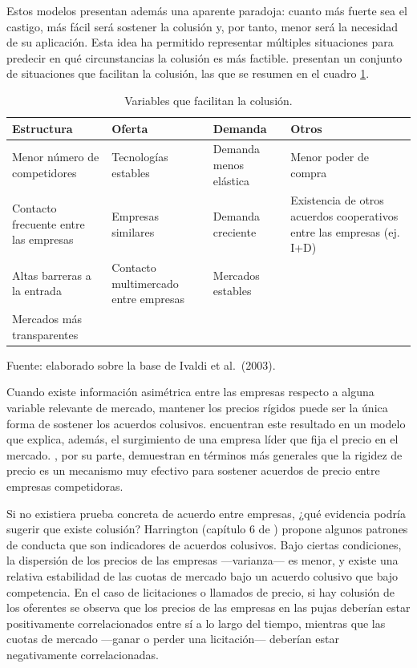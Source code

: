 \documentclass[
  12pt,
  spanish,
]{book}
\begin{document}
Estos modelos presentan además una aparente paradoja: cuanto más fuerte sea el castigo, más fácil será sostener la colusión y, por tanto, menor será la necesidad de su aplicación. Esta idea ha permitido representar múltiples situaciones para predecir en qué circunstancias la colusión es más factible. \citet{Ivaldi2003} presentan un conjunto de situaciones que facilitan la colusión, las que se resumen en el cuadro \ref{tab:cuadro4}.

\begin{table}

\caption{\label{tab:cuadro4}Variables que facilitan la colusión.}
\centering
\begin{tabular}[t]{l|l|l|l}
\hline
Estructura & Oferta & Demanda & Otros\\
\hline
Menor número de competidores & Tecnologías estables & Demanda menos elástica & Menor poder de compra\\
\hline
Contacto frecuente entre las empresas & Empresas similares & Demanda creciente & Existencia de otros acuerdos cooperativos entre las empresas (ej. I+D)\\
\hline
Altas barreras a la entrada & Contacto multimercado entre empresas & Mercados estables & \\
\hline
Mercados más transparentes &  &  & \\
\hline
\end{tabular}
\end{table}

Fuente: elaborado sobre la base de Ivaldi et al.~(2003).

Cuando existe información asimétrica entre las empresas respecto a alguna variable relevante de mercado, mantener los precios rígidos puede ser la única forma de sostener los acuerdos colusivos. \citet{Rotemberg1990} encuentran este resultado en un modelo que explica, además, el surgimiento de una empresa líder que fija el precio en el mercado. \citet{Athey2004}, por su parte, demuestran en términos más generales que la rigidez de precio es un mecanismo muy efectivo para sostener acuerdos de precio entre empresas competidoras.

Si no existiera prueba concreta de acuerdo entre empresas, ¿qué evidencia podría sugerir que existe colusión? Harrington (capítulo 6 de \citet{Buccirossi2008}) propone algunos patrones de conducta que son indicadores de acuerdos colusivos. Bajo ciertas condiciones, la dispersión de los precios de las empresas ---varianza--- es menor, y existe una relativa estabilidad de las cuotas de mercado bajo un acuerdo colusivo que bajo competencia. En el caso de licitaciones o llamados de precio, si hay colusión de los oferentes se observa que los precios de las empresas en las pujas deberían estar positivamente correlacionados entre sí a lo largo del tiempo, mientras que las cuotas de mercado ---ganar o perder una licitación--- deberían estar negativamente correlacionadas.
\end{document}
